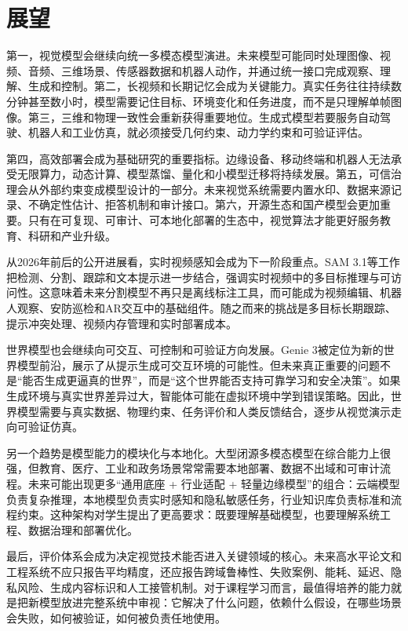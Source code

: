 \documentclass[UTF8,a4paper,12pt]{ctexart}
\newcommand{\model}[1]{\textsf{#1}}
\begin{document}
\section{展望}
第一，视觉模型会继续向统一多模态模型演进。未来模型可能同时处理图像、视频、音频、三维场景、传感器数据和机器人动作，并通过统一接口完成观察、理解、生成和控制。第二，长视频和长期记忆会成为关键能力。真实任务往往持续数分钟甚至数小时，模型需要记住目标、环境变化和任务进度，而不是只理解单帧图像。第三，三维和物理一致性会重新获得重要地位。生成式模型若要服务自动驾驶、机器人和工业仿真，就必须接受几何约束、动力学约束和可验证评估。

第四，高效部署会成为基础研究的重要指标。边缘设备、移动终端和机器人无法承受无限算力，动态计算、模型蒸馏、量化和小模型迁移将持续发展。第五，可信治理会从外部约束变成模型设计的一部分。未来视觉系统需要内置水印、数据来源记录、不确定性估计、拒答机制和审计接口。第六，开源生态和国产模型会更加重要。只有在可复现、可审计、可本地化部署的生态中，视觉算法才能更好服务教育、科研和产业升级。

从2026年前后的公开进展看，实时视频感知会成为下一阶段重点。\model{SAM 3.1}等工作把检测、分割、跟踪和文本提示进一步结合，强调实时视频中的多目标推理与可访问性\cite{sam31}。这意味着未来分割模型不再只是离线标注工具，而可能成为视频编辑、机器人观察、安防巡检和AR交互中的基础组件。随之而来的挑战是多目标长期跟踪、提示冲突处理、视频内存管理和实时部署成本。

世界模型也会继续向可交互、可控制和可验证方向发展。\model{Genie 3}被定位为新的世界模型前沿，展示了从提示生成可交互环境的可能性\cite{genie3}。但未来真正重要的问题不是“能否生成更逼真的世界”，而是“这个世界能否支持可靠学习和安全决策”。如果生成环境与真实世界差异过大，智能体可能在虚拟环境中学到错误策略。因此，世界模型需要与真实数据、物理约束、任务评价和人类反馈结合，逐步从视觉演示走向可验证仿真。

另一个趋势是模型能力的模块化与本地化。大型闭源多模态模型在综合能力上很强，但教育、医疗、工业和政务场景常常需要本地部署、数据不出域和可审计流程。未来可能出现更多“通用底座 + 行业适配 + 轻量边缘模型”的组合：云端模型负责复杂推理，本地模型负责实时感知和隐私敏感任务，行业知识库负责标准和流程约束。这种架构对学生提出了更高要求：既要理解基础模型，也要理解系统工程、数据治理和部署优化。

最后，评价体系会成为决定视觉技术能否进入关键领域的核心。未来高水平论文和工程系统不应只报告平均精度，还应报告跨域鲁棒性、失败案例、能耗、延迟、隐私风险、生成内容标识和人工接管机制。对于课程学习而言，最值得培养的能力就是把新模型放进完整系统中审视：它解决了什么问题，依赖什么假设，在哪些场景会失败，如何被验证，如何被负责任地使用。
\end{document}
